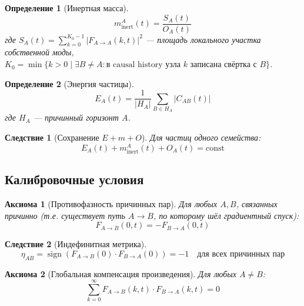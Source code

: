 \documentclass[11pt,a4paper]{article}
\newtheorem{definition}{Определение}[section]
\newtheorem{axiom}{Аксиома}[section]
\newtheorem{corollary}{Следствие}[section]
\theoremstyle{definition}
\begin{document}
\begin{definition}[Инертная масса]
\begin{equation}
    m_{\text{inert}}^A(t) = \frac{S_A(t)}{O_A(t)}
\end{equation}
где $S_A(t) = \sum_{k=0}^{K_0-1} |F_{A \to A}(k, t)|^2$ --- площадь локального участка собственной моды,
$K_0 = \min\{k > 0 \mid \exists B \neq A: \text{в causal history узла } k \text{ записана свёртка с } B\}$.
\end{definition}

\begin{definition}[Энергия частицы]
\begin{equation}
    E_A(t) = \frac{1}{|H_A|} \sum_{B \in H_A} |C_{AB}(t)|
\end{equation}
где $H_A$ --- причинный горизонт $A$.
\end{definition}

\begin{corollary}[Сохранение $E + m + O$]
Для частиц одного семейства:
\begin{equation}
    E_A(t) + m_{\text{inert}}^A(t) + O_A(t) = \text{const}
\end{equation}
\end{corollary}

\subsection{Калибровочные условия}

\begin{axiom}[Противофазность причинных пар]
Для любых $A, B$, связанных причинно (т.е. существует путь $A \to B$, по которому шёл градиентный спуск):
\begin{equation}
    F_{A \to B}(0, t) = -F_{B \to A}(0, t)
\end{equation}
\end{axiom}

\begin{corollary}[Индефинитная метрика]
\begin{equation}
    \eta_{AB} = \operatorname{sign}(F_{A \to B}(0) \cdot F_{B \to A}(0)) = -1 \quad \text{для всех причинных пар}
\end{equation}
\end{corollary}

\begin{axiom}[Глобальная компенсация произведения]
Для любых $A \neq B$:
\begin{equation}
    \sum_{k=0}^{\infty} F_{A \to B}(k, t) \cdot F_{B \to A}(k, t) = 0
\end{equation}
\end{axiom}
\end{document}
